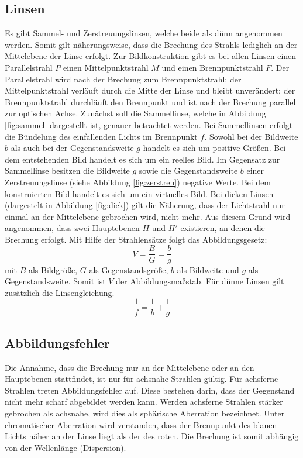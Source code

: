 \subsection{Linsen}
Es gibt Sammel- und Zerstreuungslinsen, welche beide als dünn angenommen werden. Somit gilt näherungsweise, dass die Brechung des Strahls lediglich an der Mittelebene der Linse erfolgt. Zur Bildkonstruktion gibt es bei allen Linsen einen Parallelstrahl $P$ einen Mittelpunktstrahl $M$ und einen Brennpunktstrahl $F$. Der Parallelstrahl wird nach der Brechung zum Brennpunktstrahl; der Mittelpunktstrahl verläuft durch die Mitte der Linse und bleibt unverändert; der Brennpunktstrahl durchläuft den Brennpunkt und ist nach der Brechung parallel zur optischen Achse.
Zunächst soll die Sammellinse, welche in Abbildung \ref{fig:sammel} dargestellt ist, genauer betrachtet werden.
 Bei Sammellinsen erfolgt die Bündelung des einfallenden Lichts im Brennpunkt $f$. Sowohl bei der Bildweite $b$ als auch bei der Gegenstandsweite $g$ handelt es sich um positive Größen. Bei dem entstehenden Bild handelt es sich um ein reelles Bild.
Im Gegensatz zur Sammellinse besitzen die Bildweite $g$ sowie die Gegenstandsweite $b$ einer Zerstreuungslinse (siehe Abbildung \ref{fig:zerstreu}) negative Werte. Bei dem konstruierten Bild handelt es sich um ein virtuelles Bild.
Bei dicken Linsen (dargestelt in Abbildung \ref{fig:dick}) gilt die Näherung, dass der Lichtstrahl nur einmal an der Mittelebene gebrochen wird, nicht mehr. Aus diesem Grund wird angenommen, dass zwei Hauptebenen $H$ und $H'$ existieren, an denen die Brechung erfolgt.
Mit Hilfe der Strahlensätze folgt das Abbildungsgesetz:
\begin{equation}
  \label{eqn:abbildung}
  V=\frac{B}{G}=\frac{b}{g}
\end{equation}
mit $B$ als Bildgröße, $G$ als Gegenstandsgröße, $b$ als Bildweite und $g$ als Gegenstandsweite. Somit ist $V$ der Abbildungsmaßstab.
Für dünne Linsen gilt zusätzlich die Linsengleichung.
\begin{equation}
  \label{eqn:linse}
  \frac{1}{f}=\frac{1}{b}+\frac{1}{g}
\end{equation}

\subsection{Abbildungsfehler}
Die Annahme, dass die Brechung nur an der Mittelebene oder an den Hauptebenen stattfindet, ist nur für achsnahe Strahlen gültig. Für achsferne Strahlen treten Abbildungsfehler auf. Diese bestehen darin, dass der Gegenstand nicht mehr scharf abgebildet werden kann. Werden achsferne Strahlen stärker gebrochen als achsnahe, wird dies als sphärische Aberration bezeichnet.
Unter chromatischer Aberration wird verstanden, dass der Brennpunkt des blauen Lichts näher an der Linse liegt als der des roten. Die Brechung ist somit abhängig von der Wellenlänge (Dispersion).
